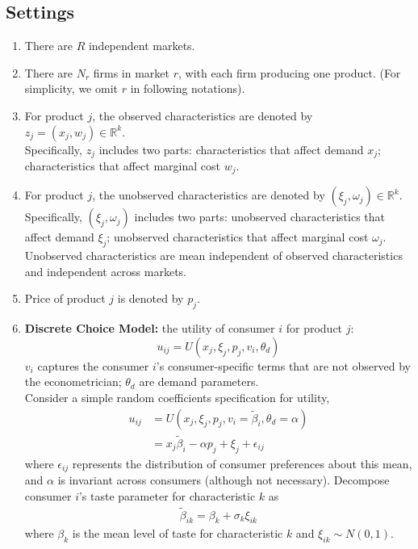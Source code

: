 \documentclass[11pt]{elegantbook}
\begin{document}
\subsection{Settings}
\begin{enumerate}
    \item There are $R$ independent markets.
    \item There are $N_r$ firms in market $r$, with each firm producing one product. (For simplicity, we omit $r$ in following notations).
    \item For product $j$, the observed characteristics are denoted by $z_{j}=(x_j,w_j)\in \mathbb{R}^k$.\\ Specifically, $z_j$ includes two parts:
    \subitem characteristics that affect demand $x_j$;
    \subitem characteristics that affect marginal cost $w_j$.
    \item For product $j$, the unobserved characteristics are denoted by $(\xi_j,\omega_j)\in \mathbb{R}^k$.\\ Specifically, $(\xi_j,\omega_j)$ includes two parts:
    \subitem unobserved characteristics that affect demand $\xi_j$;
    \subitem unobserved characteristics that affect marginal cost $\omega_j$.\\
    Unobserved characteristics are mean independent of observed characteristics and independent across markets.
    \item Price of product $j$ is denoted by $p_j$.
    \item \textbf{Discrete Choice Model:} the utility of consumer $i$ for product $j$: $$u_{ij}=U(x_j,\xi_j,p_j,v_i,\theta_d)$$
    \subitem $v_i$ captures the consumer $i$'s consumer-specific terms that are not observed by the econometrician;
    \subitem $\theta_d$ are demand parameters.\\
    Consider a simple random coefficients specification for utility,
    \begin{equation}
        \begin{aligned}
            u_{ij}&=U(x_j,\xi_j,p_j,v_i=\tilde{\beta}_i,\theta_d=\alpha)\\
            &=x_j\tilde{\beta}_i-\alpha p_j+\xi_j+\epsilon_{ij}
        \end{aligned}
        \nonumber
    \end{equation}
    where $\epsilon_{ij}$ represents the distribution of consumer preferences about this mean, and $\alpha$ is invariant across consumers (although not necessary).
    \subitem Decompose consumer $i$'s taste parameter for characteristic $k$ as
    \begin{equation}
        \begin{aligned}
            \tilde{\beta}_{ik}=\beta_k+\sigma_k\xi_{ik}
        \end{aligned}
        \nonumber
    \end{equation}
    where $\beta_k$ is the mean level of taste for characteristic $k$ and $\xi_{ik}\sim N(0,1)$.
\end{enumerate}
\end{document}
